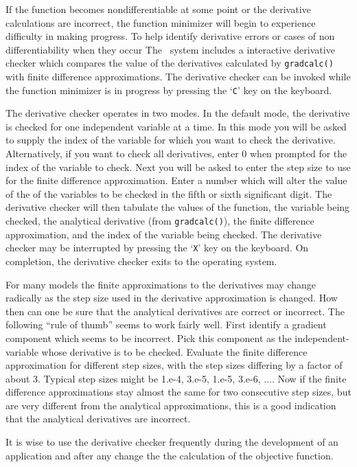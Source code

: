 \documentclass[12pt]{book}
\begin{document}
If the function becomes nondifferentiable at some point or the
derivative calculations are incorrect, the function minimizer will
begin to experience difficulty in making progress.
To help identify derivative errors or cases of non differentiability 
when they occur
The \AD\ system includes a interactive derivative checker which compares the
value of the derivatives calculated by {\tt gradcalc()} with 
finite difference approximations. The derivative checker 
can be invoked while the
function minimizer is in progress by pressing the `{\tt C}' key on the keyboard.

The derivative checker operates in two modes. In 
the default mode, the derivative is checked for one independent variable 
at a time. In this mode you will be
asked to supply the index of the variable for which you want to check
the derivative. 
Alternatively, if you want to check all derivatives, enter $0$ when
prompted for the index of the variable to check. Next
you will be asked to enter the step size to use for the finite difference
approximation. 
Enter a number which will alter the value of the of the variables
to be checked in the fifth or sixth significant digit. 
The derivative checker will
then tabulate the values of the function, the variable being checked,
the analytical derivative (from {\tt gradcalc()}), the finite difference
approximation, and the index of the variable being checked.
The derivative checker may be interrupted by pressing the `{\tt X}'
key on the keyboard. On completion, the derivative checker exits to
the operating system. 

For many models the finite approximations to the derivatives may
change radically as the step size used in the derivative approximation 
is changed. How then can one be sure that the analytical derivatives 
are correct or incorrect. The following ``rule of thumb'' seems to
work fairly well. First identify a gradient component which seems
to be incorrect. Pick this component as the independent-variable
whose derivative is to be checked. Evaluate the finite difference
approximation for different step sizes, with the step sizes
differing by a factor of about 3. Typical step sizes might be
1.e-4, 3.e-5, 1.e-5, 3.e-6, $\ldots$. Now if the finite difference
approximations stay almost the same for two consecutive step sizes,
but are very different from the analytical approximations, this is
a good indication that the analytical derivatives are incorrect.

 It is wise to use the derivative checker
frequently during the development of an application and after any change
the the calculation of the objective function.
\end{document}
